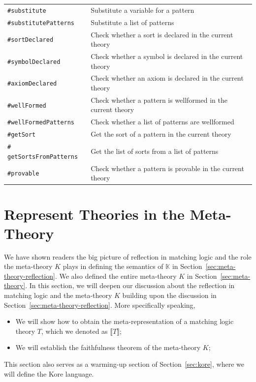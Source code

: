 \documentclass[UTF8,11pt]{article}
\theoremstyle{plain}
\theoremstyle{definition}
\theoremstyle{remark}
\newcommand{\K}{\mbox{$\mathbb{K}$}\xspace}
\newcommand{\denote}[1]{\llbracket{#1}\rrbracket}
\newcommand{\sharpsymbol}{\#}
\newcommand{\KsortDeclared}{\texttt{\sharpsymbol sortDeclared}}
\newcommand{\KsymbolDeclared}{\texttt{\sharpsymbol symbolDeclared}}
\newcommand{\KaxiomDeclared}{\texttt{\sharpsymbol axiomDeclared}}
\newcommand{\KwellFormed}{\texttt{\sharpsymbol wellFormed}}
\newcommand{\KwellFormedPatterns}{\texttt{\sharpsymbol wellFormedPatterns}}
\newcommand{\KgetSort}{\texttt{\sharpsymbol getSort}}
\newcommand{\KgetSortsFromPatterns}{\texttt{\sharpsymbol 
  getSortsFromPatterns}}
\newcommand{\Ksubstitute}{\texttt{\sharpsymbol substitute}}
\newcommand{\KsubstitutePatterns}{\texttt{\sharpsymbol substitutePatterns}}
\newcommand{\Kdeduce}{\textup{\texttt{\sharpsymbol provable}}}
\begin{document}
\begin{longtable}{l|l}
	    \Ksubstitute & Substitute a variable for a pattern \\
	    \KsubstitutePatterns & Substitute a list of patterns \\
	    \KsortDeclared & Check whether a sort is declared in the current theory 
	    \\
	    \KsymbolDeclared & Check whether a symbol is declared in the current 
	    theory \\
	    \KaxiomDeclared & Check whether an axiom is declared in the current 
	    theory \\
	    \KwellFormed & Check whether a pattern is wellformed in the current 
	    theory \\
	    \KwellFormedPatterns & Check whether a list of patterns are wellformed 
	    \\
	    \KgetSort & Get the sort of a pattern in the current theory \\
	    \KgetSortsFromPatterns & Get the list of sorts from a list of patterns 
	    \\
	    \Kdeduce & Check whether a pattern is provable in the current theory
	\end{longtable}


\section{Represent Theories in the Meta-Theory}
\label{sec:reflect}
We have shown readers the big picture of reflection in matching logic and  
the role the meta-theory $K$ plays in defining the semantics of \K in 
Section~\ref{sec:meta-theory-reflection}.
We also defined the entire meta-theory $K$ in 
Section~\ref{sec:meta-theory}.
In this section, we will deepen our discussion about the reflection in matching 
logic and the meta-theory $K$ building upon the discussion in 
Section~\ref{sec:meta-theory-reflection}.
More specifically speaking,
\begin{itemize}
	\item We will show how to obtain 
	the meta-representation of a matching logic theory $T$, which we denoted as 
	$\denote{T}$;
	\item We will establish the faithfulness theorem of the meta-theory $K$;
\end{itemize}
This section also serves as a warming-up section of Section~\ref{sec:kore}, 
where we will define the Kore language.
\end{document}
